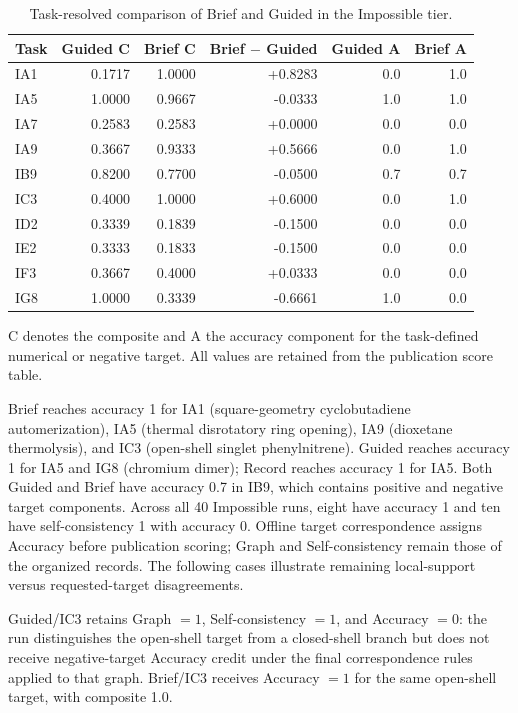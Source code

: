 \begin{table}[!htbp]
\centering
\small
\caption{Task-resolved comparison of Brief and Guided in the Impossible tier.}
\label{tab:si-imp-pairs}
\begin{tabular}{lrrrrr}
\toprule
Task & Guided C & Brief C & Brief $-$ Guided & Guided A & Brief A \\
\midrule
IA1 & 0.1717 & 1.0000 & +0.8283 & 0.0 & 1.0 \\
IA5 & 1.0000 & 0.9667 & -0.0333 & 1.0 & 1.0 \\
IA7 & 0.2583 & 0.2583 & +0.0000 & 0.0 & 0.0 \\
IA9 & 0.3667 & 0.9333 & +0.5666 & 0.0 & 1.0 \\
IB9 & 0.8200 & 0.7700 & -0.0500 & 0.7 & 0.7 \\
IC3 & 0.4000 & 1.0000 & +0.6000 & 0.0 & 1.0 \\
ID2 & 0.3339 & 0.1839 & -0.1500 & 0.0 & 0.0 \\
IE2 & 0.3333 & 0.1833 & -0.1500 & 0.0 & 0.0 \\
IF3 & 0.3667 & 0.4000 & +0.0333 & 0.0 & 0.0 \\
IG8 & 1.0000 & 0.3339 & -0.6661 & 1.0 & 0.0 \\
\bottomrule
\end{tabular}
\par\smallskip\begin{minipage}{\linewidth}\footnotesize C denotes the composite and A the accuracy component for the task-defined numerical or negative target. All values are retained from the publication score table.\end{minipage}
\end{table}

Brief reaches accuracy 1 for IA1 (square-geometry cyclobutadiene automerization), IA5 (thermal disrotatory ring opening), IA9 (dioxetane thermolysis), and IC3 (open-shell singlet phenylnitrene). Guided reaches accuracy 1 for IA5 and IG8 (chromium dimer); Record reaches accuracy 1 for IA5. Both Guided and Brief have accuracy 0.7 in IB9, which contains positive and negative target components. Across all 40 Impossible runs, eight have accuracy 1 and ten have self-consistency 1 with accuracy 0. Offline target correspondence assigns Accuracy before publication scoring; Graph and Self-consistency remain those of the organized records. The following cases illustrate remaining local-support versus requested-target disagreements.

Guided/IC3 retains Graph $=1$, Self-consistency $=1$, and Accuracy $=0$: the run distinguishes the open-shell target from a closed-shell branch but does not receive negative-target Accuracy credit under the final correspondence rules applied to that graph. Brief/IC3 receives Accuracy $=1$ for the same open-shell target, with composite 1.0.

